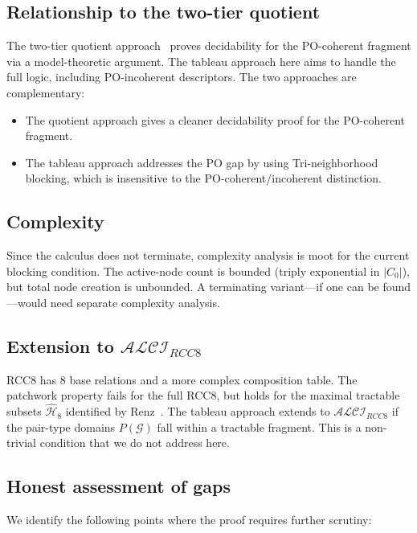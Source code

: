 \documentclass[a4paper,11pt]{article}
\theoremstyle{definition}
\newcommand{\ALCIRCC}[1]{\ensuremath{\mathcal{ALCI}_{\mathit{RCC#1}}}}
\newcommand{\GG}{\ensuremath{\mathcal{G}}}
\begin{document}
\subsection{Relationship to the two-tier quotient}

The two-tier quotient approach~\cite{TwoTier} proves
decidability for the PO-coherent fragment via a model-theoretic
argument.  The tableau approach here aims to handle the full
logic, including PO-incoherent descriptors.  The two approaches
are complementary:
\begin{itemize}[nosep]
  \item The quotient approach gives a cleaner decidability proof
    for the PO-coherent fragment.
  \item The tableau approach addresses the PO gap by using
    Tri-neighborhood blocking, which is insensitive to the
    PO-coherent/incoherent distinction.
\end{itemize}

\subsection{Complexity}

Since the calculus does not terminate, complexity analysis
is moot for the current blocking condition.  The active-node
count is bounded (triply exponential in $|C_0|$), but total
node creation is unbounded.  A terminating variant---if
one can be found---would need separate complexity analysis.

\subsection{Extension to $\ALCIRCC{8}$}

RCC8 has 8 base relations and a more complex composition table.
The patchwork property fails for the full RCC8, but holds for
the maximal tractable subsets $\hat{\mathcal{H}}_8$ identified
by Renz~\cite{Renz1999}.  The tableau approach extends to
$\ALCIRCC{8}$ if the pair-type domains $P(\GG)$ fall within
a tractable fragment.  This is a non-trivial condition that
we do not address here.

\subsection{Honest assessment of gaps}\label{sec:gaps}

We identify the following points where the proof requires
further scrutiny:
\end{document}
